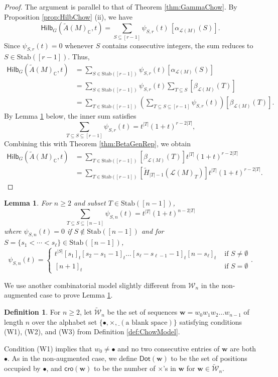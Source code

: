 \documentclass[reqno]{amsart}
\newcommand{\Stab}{{\mathrm{Stab}}}
\newcommand{\cro}{{\mathsf{cro}}}
\renewcommand{\Dot}{{\mathsf{Dot}}}
\renewcommand{\L}{{\mathcal{L}}}
\newcommand{\Hilb}{{\mathsf{Hilb}}}
\newtheorem{lem}[thm]{Lemma}
\theoremstyle{definition}
\newtheorem{defi}[thm]{Definition}
\theoremstyle{remark}
\begin{document}
\begin{proof}
The argument is parallel to that of Theorem \ref{thm:GammaChow}.
By Proposition \ref{prop:HilbChow} (ii), we have
\[
\Hilb_G(\widetilde{A}(M)_{\mathbb{C}},t)
=\sum_{S\subseteq [r-1]} \psi_{S,r}(t)\,[\alpha_{\L(M)}(S)].
\]
Since $\psi_{S,r}(t)=0$ whenever $S$ contains consecutive integers, the sum reduces to $S\in\Stab([r-1])$. Thus, 
\begin{align*}
    \Hilb_G(\widetilde{A}(M)_{\mathbb{C}},t)
    &=\sum_{S\in\Stab([r-1])}\psi_{S,r}(t)[\alpha_{\L(M)}(S)]\\
    &=\sum_{S\in\Stab([r-1])}\psi_{S,r}(t)\sum_{T\subseteq S}[\beta_{\L(M)}(T)]\\
    &=\sum_{T\in\Stab([r-1])}\left(\sum_{T\subseteq S\subseteq [r-1]}\psi_{S,r}(t)\right)[\beta_{\L(M)}(T)].
\end{align*}
By Lemma \ref{lem:AugIdentity} below, the inner sum satisfies
\[
    \sum_{T\subseteq S\subseteq [r-1]}\psi_{S,r}(t)=t^{|T|}(1+t)^{r-2|T|},
\] 
Combining this with Theorem \ref{thm:BetaGenRep}, we obtain
\begin{align*}
    \Hilb_G(\widetilde{A}(M)_{\mathbb{C}},t)
    &=\sum_{T\in\Stab([r-1])}[\beta_{\L(M)}(T)]t^{|T|}(1+t)^{r-2|T|}\\
    &=\sum_{T\in\Stab([r-1])}[\tilde{H}_{|T|-1}(\L(M)_T)]t^{|T|}(1+t)^{r-2|T|}.
\end{align*}
\end{proof}

\begin{lem} \label{lem:AugIdentity}
For $n\ge 2$ and subset $T\in\Stab([n-1])$, 
\begin{equation} \label{eq:AugIdentity}
    \sum_{T\subseteq S\subseteq [n-1]}\psi_{S,n}(t)=t^{|T|}(1+t)^{n-2|T|}
\end{equation}
where $\psi_{S,n}(t)=0$ if $S\notin\Stab([n-1])$ and for $S=\{s_1<\cdots<s_{\ell}\}\in\Stab([n-1])$,
\[
    \psi_{S,n}(t)=\begin{cases}
        t^{|S|}[s_1]_t[s_2-s_1-1]_t\ldots[s_{\ell}-s_{\ell-1}-1]_t[n-s_{\ell}]_t  & \text{ if }S\neq\emptyset\\
        [n+1]_t  & \text{ if }S=\emptyset
    \end{cases}.
\]
\end{lem}

We use another combinatorial model slightly different from $\mathcal{W}_n$ in the non-augmented case to prove Lemma \ref{lem:AugIdentity}. 

\begin{defi}
For $n\ge 2$, let $\widetilde{\mathcal{W}}_n$ be the set of sequences $\mathbf{w}=w_0w_1w_2\ldots w_{n-1}$ of length $n$ over the alphabet set $\{\bullet, \times, \underline{\phantom{~}} (\text{a blank space})\}$ satisfying conditions
(W1), (W2), and (W3) from Definition \ref{def:ChowModel}.
\end{defi}
Condition (W1) implies that $w_0\neq \bullet$ and no two consecutive entries of $\mathbf{w}$ are both $\bullet$. 
As in the non-augmented case, we define $\Dot(\mathbf{w})$ to be the set of positions occupied by $\bullet$, and $\cro(\mathbf{w})$ to be the number of $\times$’s in $\mathbf{w}$ for $\mathbf{w}\in\widetilde{\mathcal{W}}_n$.
 
\end{document}
